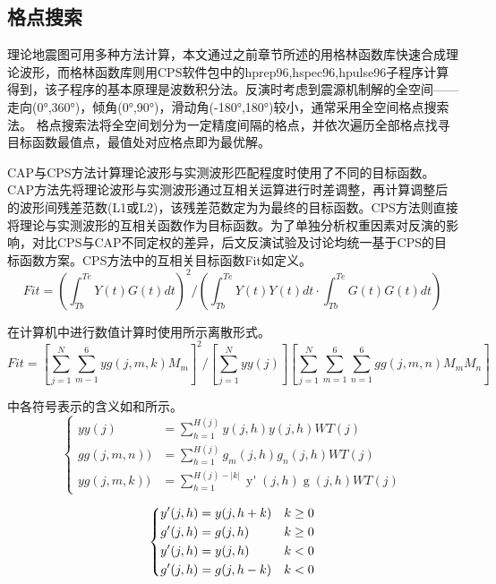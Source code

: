 \subsection{格点搜索}

理论地震图可用多种方法计算，本文通过之前章节所述的用格林函数库快速合成理论波形，而格林函数库则用CPS软件包中的hprep96,hspec96,hpulse96子程序计算得到，该子程序的基本原理是波数积分法。反演时考虑到震源机制解的全空间——走向(0°,360°)，倾角(0°,90°)，滑动角(-180°,180°)较小，通常采用全空间格点搜索法。
格点搜索法将全空间划分为一定精度间隔的格点，并依次遍历全部格点找寻目标函数最值点，最值处对应格点即为最优解。

CAP与CPS方法计算理论波形与实测波形匹配程度时使用了不同的目标函数。CAP方法先将理论波形与实测波形通过互相关运算进行时差调整，再计算调整后的波形间残差范数(L1或L2)\citep{Zhao1994}，该残差范数定为为最终的目标函数。CPS方法则直接将理论与实测波形的互相关函数作为目标函数。为了单独分析权重因素对反演的影响，对比CPS与CAP不同定权的差异，后文反演试验及讨论均统一基于CPS的目标函数方案。CPS方法中的互相关目标函数Fit如定义。
\begin{equation}
\label{eq2_12}
Fit=(\int_{Tb}^{Te}Y(t)G(t)dt)^2/(\int_{Tb}^{Te}Y(t)Y(t)dt\cdot\int_{Tb}^{Te}G(t)G(t)dt)
\end{equation}

在计算机中进行数值计算时使用所示离散形式。
\begin{equation}
\label{eq2_13}
Fit=[\sum_{j=1}^{N}\sum_{m-1}^{6}yg(j,m,k)M_m]^2/{[\sum_{j=1}^{N}yy(j)][\sum_{j=1}^{N}\sum_{m=1}^{6}\sum_{n=1}^{6}gg(j,m,n)M_mM_n]}
\end{equation}

中各符号表示的含义如和所示。
\begin{equation}
\label{eq2_14}
\left\{
    \begin{aligned}
    yy(j)&=\sum_{h=1}^{H(j)}y(j,h)y(j,h)WT(j)\\
    gg(j,m,n))&=\sum_{h=1}^{H(j)}g_{m}(j,h)g_{n}(j,h)WT(j)\\
    yg(j,m,k))&=\sum_{h=1}^{H(j)-|k|}\mathop{{y}'}(j,h)\mathop{{g}'_{m}}(j,h)WT(j)
    \end{aligned}
\right.
\end{equation}

\begin{equation}
\label{eq2_15}
\left\{
    \begin{aligned}
    \mathop{{y}'}(j,h)&=y(j,h+k) &k\geq0 \\
    \mathop{{g}'}(j,h)&=g(j,h)   &k\geq0 \\
    \mathop{{y}'}(j,h)&=y(j,h)   &k<0 \\
    \mathop{{g}'}(j,h)&=g(j,h-k) &k<0 \\
    \end{aligned}   \\
\right.
\end{equation}

